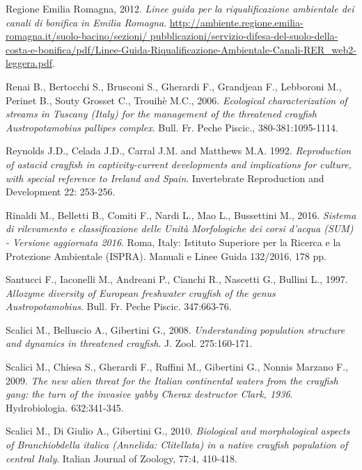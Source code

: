 \documentclass[11pt,a4paper,italian,twoside,openany]{memoir}
\begin{document}
\begin{thebibliography}{9}
 Regione Emilia Romagna, 2012. \emph{Linee guida per la riqualificazione ambientale dei canali di bonifica in Emilia Romagna}. \url{http://ambiente.regione.emilia-romagna.it/suolo-bacino/sezioni/ pubblicazioni/servizio-difesa-del-suolo-della-costa-e-bonifica/pdf/Linee-Guida-Riqualificazione-Ambientale-Canali-RER_web2-leggera.pdf}.

 Renai B., Bertocchi S., Brusconi S., Gherardi F., Grandjean F., Lebboroni M., Perinet B., Souty Grosset C., Trouihè M.C., 2006. \emph{Ecological characterization of streams in Tuscany (Italy) for the management of the threatened crayfish Austropotamobius pallipes complex}. Bull. Fr. Peche Piscic., 380-381:1095-1114. 

 Reynolds J.D., Celada J.D., Carral J.M. and Matthews M.A. 1992. \emph{Reproduction of astacid crayfish in captivity-current developments and implications for culture, with special reference to Ireland and Spain}. Invertebrate Reproduction and Development 22: 253-256.

 Rinaldi M., Belletti B., Comiti F., Nardi L., Mao L., Bussettini M., 2016. \emph{Sistema di rilevamento e classificazione delle Unità Morfologiche dei corsi d'acqua (SUM) - Versione aggiornata 2016}. Roma, Italy: Istituto Superiore per la Ricerca e la Protezione Ambientale (ISPRA). Manuali e Linee Guida 132/2016, 178 pp.

 Santucci F., Iaconelli M., Andreani P., Cianchi R., Nascetti G., Bullini L., 1997. \emph{Allozyme diversity of European freshwater crayfish of the genus Austropotamobius}. Bull. Fr. Peche Piscic. 347:663-76.

 Scalici M., Belluscio A., Gibertini G., 2008. \emph{Understanding population structure and dynamics in threatened crayfish}. J. Zool. 275:160-171.

 Scalici M., Chiesa S., Gherardi F., Ruffini M., Gibertini G., Nonnis Marzano F., 2009. \emph{The new alien threat for the Italian continental waters from the crayfish gang: the turn of the invasive 
yabby Cherax destructor Clark, 1936}. Hydrobiologia. 632:341-345.

 Scalici M., Di Giulio A., Gibertini G., 2010. \emph{Biological and morphological aspects of Branchiobdella italica (Annelida: Clitellata) in a native crayfish population of central Italy}. Italian Journal of Zoology, 77:4, 410-418.


\end{thebibliography}
\end{document}
